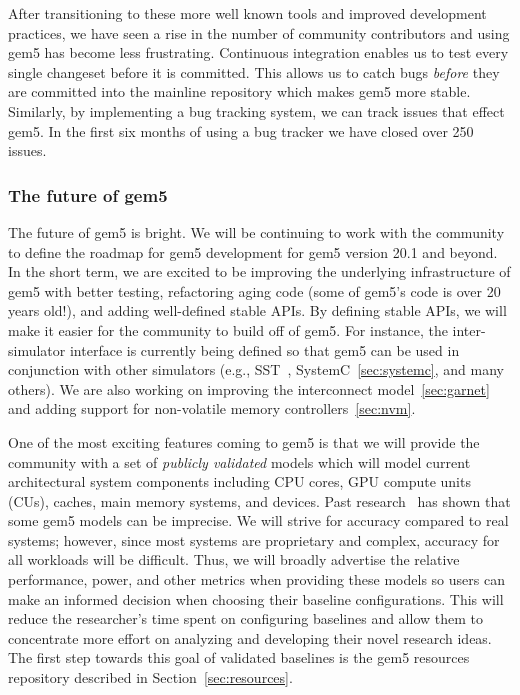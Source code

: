 After transitioning to these more well known tools and improved development practices, we have seen a rise in the number of community contributors and using gem5 has become less frustrating.
Continuous integration enables us to test every single changeset before it is committed.
This allows us to catch bugs \emph{before} they are committed into the mainline repository which makes gem5 more stable.
Similarly, by implementing a bug tracking system, we can track issues that effect gem5.
In the first six months of using a bug tracker we have closed over 250 issues.

\subsubsection*{The future of gem5}
The future of gem5 is bright.
We will be continuing to work with the community to define the roadmap for gem5 development for gem5 version 20.1 and beyond.
In the short term, we are excited to be improving the underlying infrastructure of gem5 with better testing, refactoring aging code (some of gem5's code is over 20 years old!), and adding well-defined stable APIs.
By defining stable APIs, we will make it easier for the community to build off of gem5.
For instance, the inter-simulator interface is currently being defined so that gem5 can be used in conjunction with other simulators (e.g., SST~\cite{}, SystemC~\ref{sec:systemc}, and many others).
We are also working on improving the interconnect model~\ref{sec:garnet} and adding support for non-volatile memory controllers~\ref{sec:nvm}.

One of the most exciting features coming to gem5 is that we will provide the community with a set of \emph{publicly validated} models which will model current architectural system components including CPU cores, GPU compute units (CUs), caches, main memory systems, and devices.
Past research~\cite{butko2012accuracy, nowatzki2015architectural, endo2014micro, akram201686, asri2016simulator, akram2019validation, gutierrez2014sources, jo2018diagsim, tanimoto2017dependence, walker2018hardware} has shown that some gem5 models can be imprecise.
We will strive for accuracy compared to real systems; however, since most systems are proprietary and complex, accuracy for all workloads will be difficult.
Thus, we will broadly advertise the relative performance, power, and other metrics when providing these models so users can make an informed decision when choosing their baseline configurations.
This will reduce the researcher's time spent on configuring baselines and allow them to concentrate more effort on analyzing and developing their novel research ideas.
The first step towards this goal of validated baselines is the gem5 resources repository described in Section~\ref{sec:resources}.

